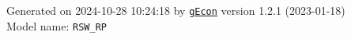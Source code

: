 \documentclass[10pt,a4paper]{article}
\numberwithin{equation}{section}
\begin{document}
\begin{landscape}
\begin{flushleft}{\large
Generated  on 2024-10-28 10:24:18 by \href{http://gecon.r-forge.r-project.org/}{\texttt{gEcon}} version 1.2.1 (2023-01-18)\\
Model name: \verb+RSW_RP+
}\end{flushleft}


\end{landscape}

\end{document}
